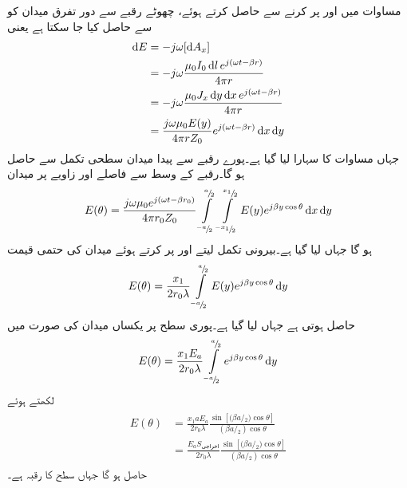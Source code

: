 مساوات  میں  اور  پر کرنے  سے  حاصل کرتے ہوئے، چھوٹے رقبے   سے دور تفرق میدان کو  سے حاصل کیا جا سکتا ہے یعنی
\begin{gather}
\begin{aligned}
\dif E &=-j \omega [\dif A_x] \\
&=-j \omega \frac{\mu_0 I_0 \dif l \, e^{j(\omega t -\beta r)}}{4\pi r}  \\
&=-j \omega \frac{\mu_0 J_x \dif y \dif x \, e^{j(\omega t -\beta r)}}{4\pi r}  \\
&=\frac{j \omega \mu_0 E(y)}{4\pi r Z_0} e^{j(\omega t-\beta r)} \dif x \dif y
\end{aligned}
\end{gather}
جہاں مساوات  کا سہارا لیا گیا ہے۔پورے رقبے  سے پیدا میدان سطحی تکمل سے حاصل ہو گا۔رقبے کے وسط سے  فاصلے اور  زاویے پر میدان
\begin{align}
E(\theta)=\frac{j \omega \mu_0 e^{j(\omega t-\beta r_0)}}{4\pi r_0 Z_0} \int \limits_{^{-a}\!/\!_2}^{^a\!/\!_2} \int \limits_{^{-x_1}\!/\!_2}^{^{x_1}\!/\!_2} E(y) e^{j\beta y \cos \theta} \dif x \dif y
\end{align}
ہو گا جہاں  لیا گیا ہے۔بیرونی تکمل لیتے اور  پر کرتے ہوئے  میدان کی حتمی قیمت  
\begin{align}\label{مساوات_اینٹینا_فوریئر_تعلق_الف}
E(\theta)=\frac{x_1}{2 r_0 \lambda} \int \limits_{^{-a}\!/\!_2}^{^a\!/\!_2}  E(y) e^{j\beta y \cos \theta} \dif y
\end{align}
حاصل ہوتی ہے جہاں  لیا گیا ہے۔پوری سطح پر یکساں میدان  کی صورت میں
\begin{align}
E(\theta)=\frac{x_1 E_a}{2 r_0 \lambda} \int \limits_{^{-a}\!/\!_2}^{^a\!/\!_2}  e^{j\beta y \cos \theta} \dif y
\end{align}
لکھتے ہوئے
\begin{gather}
\begin{aligned}\label{مساوات_اینٹینا_سطحی_دور_میدان}
E(\theta)&=\frac{x_1 a E_a }{2 r_0 \lambda} \frac{\sin [{(\beta a}\!/\!_2)\cos \theta ]}{({\beta a}\!/\!_2)\cos \theta}\\
&=\frac{E_a S_{\text{اخراجی}}}{2 r_0 \lambda} \frac{\sin [{(\beta a}\!/\!_2)\cos \theta ]}{({\beta a}\!/\!_2)\cos \theta}
\end{aligned}
\end{gather}
حاصل ہو گا جہاں  سطح کا رقبہ ہے۔

